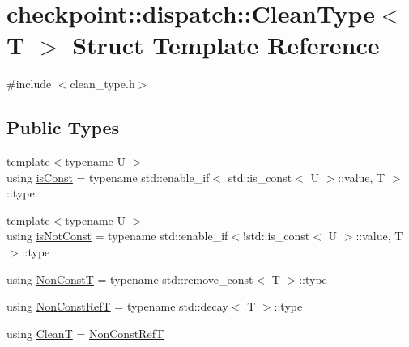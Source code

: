 \hypertarget{structcheckpoint_1_1dispatch_1_1_clean_type}{}\section{checkpoint\+:\+:dispatch\+:\+:Clean\+Type$<$ T $>$ Struct Template Reference}
\label{structcheckpoint_1_1dispatch_1_1_clean_type}


{\ttfamily \#include $<$clean\+\_\+type.\+h$>$}

\subsection*{Public Types}
\begin{DoxyCompactItemize}
\item 
{\footnotesize template$<$typename U $>$ }\\using \hyperlink{structcheckpoint_1_1dispatch_1_1_clean_type_a8edf98e1e2cbcd55b0b0a57d563be9e7}{is\+Const} = typename std\+::enable\+\_\+if$<$ std\+::is\+\_\+const$<$ U $>$\+::value, T $>$\+::type
\item 
{\footnotesize template$<$typename U $>$ }\\using \hyperlink{structcheckpoint_1_1dispatch_1_1_clean_type_a87436675be4aca146c0ff68911684634}{is\+Not\+Const} = typename std\+::enable\+\_\+if$<$!std\+::is\+\_\+const$<$ U $>$\+::value, T $>$\+::type
\item 
using \hyperlink{structcheckpoint_1_1dispatch_1_1_clean_type_af8cc50327016b4a8410504e245edeb6f}{Non\+ConstT} = typename std\+::remove\+\_\+const$<$ T $>$\+::type
\item 
using \hyperlink{structcheckpoint_1_1dispatch_1_1_clean_type_a22ac8ae19000187cd7d3d218f3efa46e}{Non\+Const\+RefT} = typename std\+::decay$<$ T $>$\+::type
\item 
using \hyperlink{structcheckpoint_1_1dispatch_1_1_clean_type_a5ca6cd4c73773e29c340901d3e6864d2}{CleanT} = \hyperlink{structcheckpoint_1_1dispatch_1_1_clean_type_a22ac8ae19000187cd7d3d218f3efa46e}{Non\+Const\+RefT}
\end{DoxyCompactItemize}

